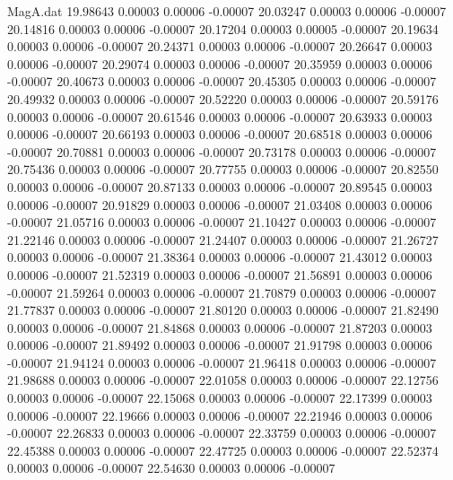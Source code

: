 \begin{filecontents}{MagA.dat}
  19.98643    0.00003    0.00006   -0.00007
  20.03247    0.00003    0.00006   -0.00007
  20.14816    0.00003    0.00006   -0.00007
  20.17204    0.00003    0.00005   -0.00007
  20.19634    0.00003    0.00006   -0.00007
  20.24371    0.00003    0.00006   -0.00007
  20.26647    0.00003    0.00006   -0.00007
  20.29074    0.00003    0.00006   -0.00007
  20.35959    0.00003    0.00006   -0.00007
  20.40673    0.00003    0.00006   -0.00007
  20.45305    0.00003    0.00006   -0.00007
  20.49932    0.00003    0.00006   -0.00007
  20.52220    0.00003    0.00006   -0.00007
  20.59176    0.00003    0.00006   -0.00007
  20.61546    0.00003    0.00006   -0.00007
  20.63933    0.00003    0.00006   -0.00007
  20.66193    0.00003    0.00006   -0.00007
  20.68518    0.00003    0.00006   -0.00007
  20.70881    0.00003    0.00006   -0.00007
  20.73178    0.00003    0.00006   -0.00007
  20.75436    0.00003    0.00006   -0.00007
  20.77755    0.00003    0.00006   -0.00007
  20.82550    0.00003    0.00006   -0.00007
  20.87133    0.00003    0.00006   -0.00007
  20.89545    0.00003    0.00006   -0.00007
  20.91829    0.00003    0.00006   -0.00007
  21.03408    0.00003    0.00006   -0.00007
  21.05716    0.00003    0.00006   -0.00007
  21.10427    0.00003    0.00006   -0.00007
  21.22146    0.00003    0.00006   -0.00007
  21.24407    0.00003    0.00006   -0.00007
  21.26727    0.00003    0.00006   -0.00007
  21.38364    0.00003    0.00006   -0.00007
  21.43012    0.00003    0.00006   -0.00007
  21.52319    0.00003    0.00006   -0.00007
  21.56891    0.00003    0.00006   -0.00007
  21.59264    0.00003    0.00006   -0.00007
  21.70879    0.00003    0.00006   -0.00007
  21.77837    0.00003    0.00006   -0.00007
  21.80120    0.00003    0.00006   -0.00007
  21.82490    0.00003    0.00006   -0.00007
  21.84868    0.00003    0.00006   -0.00007
  21.87203    0.00003    0.00006   -0.00007
  21.89492    0.00003    0.00006   -0.00007
  21.91798    0.00003    0.00006   -0.00007
  21.94124    0.00003    0.00006   -0.00007
  21.96418    0.00003    0.00006   -0.00007
  21.98688    0.00003    0.00006   -0.00007
  22.01058    0.00003    0.00006   -0.00007
  22.12756    0.00003    0.00006   -0.00007
  22.15068    0.00003    0.00006   -0.00007
  22.17399    0.00003    0.00006   -0.00007
  22.19666    0.00003    0.00006   -0.00007
  22.21946    0.00003    0.00006   -0.00007
  22.26833    0.00003    0.00006   -0.00007
  22.33759    0.00003    0.00006   -0.00007
  22.45388    0.00003    0.00006   -0.00007
  22.47725    0.00003    0.00006   -0.00007
  22.52374    0.00003    0.00006   -0.00007
  22.54630    0.00003    0.00006   -0.00007

\end{filecontents}
